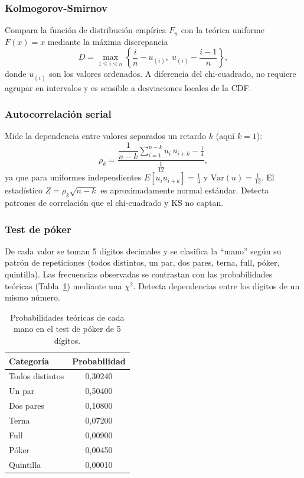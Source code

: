 \documentclass[11pt]{article}
\begin{document}
\subsubsection{Kolmogorov-Smirnov}

Compara la funci\'on de distribuci\'on emp\'irica $F_n$ con la te\'orica
uniforme $F(x)=x$ mediante la m\'axima discrepancia
\begin{equation}
D = \max_{1 \le i \le n}
\left\{ \frac{i}{n} - u_{(i)},\; u_{(i)} - \frac{i-1}{n} \right\},
\end{equation}
donde $u_{(i)}$ son los valores ordenados. A diferencia del
chi-cuadrado, no requiere agrupar en intervalos y es sensible a
desviaciones locales de la CDF.

\subsubsection{Autocorrelaci\'on serial}

Mide la dependencia entre valores separados un retardo $k$ (aqu\'i $k=1$):
\begin{equation}
\rho_k = \frac{\dfrac{1}{n-k}\displaystyle\sum_{i=1}^{n-k} u_i\,u_{i+k} - \tfrac{1}{4}}{\tfrac{1}{12}},
\end{equation}
ya que para uniformes independientes $E[u_i u_{i+k}] = \tfrac14$ y
$\mathrm{Var}(u) = \tfrac1{12}$. El estad\'istico
$Z = \rho_k\sqrt{n-k}$ es aproximadamente normal est\'andar. Detecta
patrones de correlaci\'on que el chi-cuadrado y KS no captan.

\subsubsection{Test de p\'oker}

De cada valor se toman 5 d\'igitos decimales y se clasifica la ``mano''
seg\'un su patr\'on de repeticiones (todos distintos, un par, dos pares,
terna, full, p\'oker, quintilla). Las frecuencias observadas se contrastan
con las probabilidades te\'oricas (Tabla~\ref{tab:poker}) mediante una
$\chi^2$. Detecta dependencias entre los d\'igitos de un mismo n\'umero.

\begin{table}[H]
\centering
\begin{tabular}{lc}
\toprule
\textbf{Categor\'ia} & \textbf{Probabilidad} \\
\midrule
Todos distintos & 0,30240 \\
Un par          & 0,50400 \\
Dos pares       & 0,10800 \\
Terna           & 0,07200 \\
Full            & 0,00900 \\
P\'oker         & 0,00450 \\
Quintilla       & 0,00010 \\
\bottomrule
\end{tabular}
\caption{Probabilidades te\'oricas de cada mano en el test de p\'oker de
5 d\'igitos.}
\label{tab:poker}
\end{table}
\end{document}

